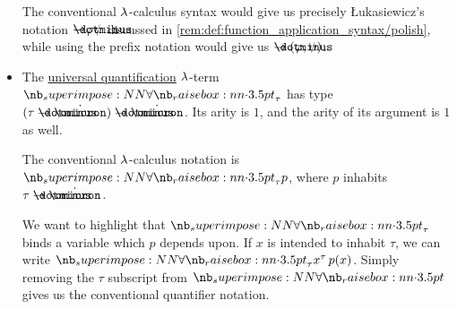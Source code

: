 \begin{remark}
\begin{itemize}
    The conventional \( {\mathrm \lambda} \)-calculus syntax would give us precisely \L{}ukasiewicz's notation \( {\synimplies} \varphi \psi \) discussed in \ref{rem:def:function_application_syntax/polish}, while using the prefix notation would give us \( \synimplies(\varphi, \psi) \).

    \item The \hyperref[def:predicate_logic_alphabet/quantifiers/universal]{universal quantification} \( {\mathrm \lambda} \)-term \( \synforall_\tau \) has type \( (\tau \synimplies \syn\omicron) \synimplies \syn\omicron \). Its arity is \( 1 \), and the arity of its argument is \( 1 \) as well.

    The conventional \( {\mathrm \lambda} \)-calculus notation is \( \synforall_\tau p \), where \( p \) inhabits \( \tau \synimplies \syn\omicron \).

    We want to highlight that \( \synforall_\tau \) binds a variable which \( p \) depends upon. If \( x \) is intended to inhabit \( \tau \), we can write \( \quantifier {\synforall_\tau} {x^\tau} p(x) \). Simply removing the \( \tau \) subscript from \( \synforall \) gives us the conventional quantifier notation.
  \end{itemize}
\end{remark}

